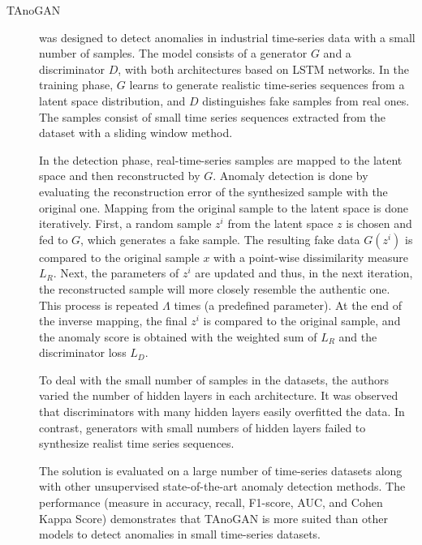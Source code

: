 \begin{description}
    \item[TAnoGAN \cite{bashar.nayak_TAnoGANTimeSeries_2020}] was designed to detect anomalies in industrial time-series data with a small number of samples. The model consists of a generator $G$ and a discriminator $D$, with both architectures based on LSTM networks. In the training phase, $G$ learns to generate realistic time-series sequences from a latent space distribution, and $D$ distinguishes fake samples from real ones. The samples consist of small time series sequences extracted from the dataset with a sliding window method. 
    
    In the detection phase, real-time-series samples are mapped to the latent space and then reconstructed by $G$. Anomaly detection is done by evaluating the reconstruction error of the synthesized sample with the original one. Mapping from the original sample to the latent space is done iteratively. First, a random sample $z^i$ from the latent space $z$ is chosen and fed to $G$, which generates a fake sample. The resulting fake data $G(z^i)$ is compared to the original sample $x$ with a point-wise dissimilarity measure $L_R$. Next, the parameters of $z^i$ are updated and thus, in the next iteration, the reconstructed sample will more closely resemble the authentic one. This process is repeated $\Lambda$ times (a predefined parameter). At the end of the inverse mapping, the final $z^i$ is compared to the original sample, and the anomaly score is obtained with the weighted sum of $L_R$ and the discriminator loss $L_D$.

    To deal with the small number of samples in the datasets, the authors varied the number of hidden layers in each architecture. It was observed that discriminators with many hidden layers easily overfitted the data. In contrast, generators with small numbers of hidden layers failed to synthesize realist time series sequences. 

    The solution is evaluated on a large number of time-series datasets along with other unsupervised state-of-the-art anomaly detection methods. The performance (measure in accuracy, recall, F1-score, AUC, and Cohen Kappa Score) demonstrates that TAnoGAN is more suited than other models to detect anomalies in small time-series datasets.
\end{description}


